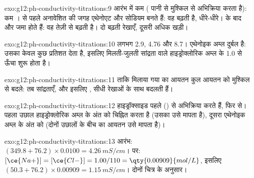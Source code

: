 \begin{solution}{exo:g12:ph-conductivity-titrations:9}
आरंभ में कम  ( पानी से मुश्किल से अभिक्रिया करता है): कम
।  से पहले अनावेशित  की जगह एथेनोएट और सोडियम 
बनते हैं: वह बढ़ती है, धीरे-धीरे।  के बाद
 और  जमा होते हैं: वह तेज़ी से बढ़ती है। दो बढ़ती रेखाएँ,
दूसरी अधिक खड़ी।
\end{solution}

\begin{solution}{exo:g12:ph-conductivity-titrations:10}
लगभग 2.9, 4.76 और 8.7। एथेनोइक अम्ल दुर्बल है: उसका केवल कुछ प्रतिशत
 देता है, इसलिए  मिलती-जुलती सांद्रता वाले हाइड्रोक्लोरिक
अम्ल के 1.0 से ऊँचा शुरू होता है।
\end{solution}

\begin{solution}{exo:g12:ph-conductivity-titrations:11}
ताकि मिलाया गया  का आयतन कुल आयतन को मुश्किल से बदले: तब
सांद्रताएँ, और इसलिए , सीधी रेखाओं के साथ बदलती हैं।
\end{solution}

\begin{solution}{exo:g12:ph-conductivity-titrations:12}
हाइड्रॉक्साइड  पहले  () से अभिक्रिया करते हैं, फिर
 से। पहला उछाल हाइड्रोक्लोरिक अम्ल के अंत को चिह्नित करता है
(उसका  उसे मापता है), दूसरा एथेनोइक
अम्ल के अंत को (दोनों उछालों के बीच का आयतन उसे मापता है)।
\end{solution}

\begin{solution}{exo:g12:ph-conductivity-titrations:13}
आरंभ: $(349.8 + 76.2) \times 0.0100 = \qty{4.26}{mS/cm}$।
 पर: $[\ce{Na+}] = [\ce{Cl-}] = 1.00/110 = \qty{0.00909}{mol/L}$,
इसलिए $(50.3 + 76.2) \times 0.00909 = \qty{1.15}{mS/cm}$। दोनों
चित्र के अनुसार।
\end{solution}

